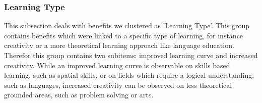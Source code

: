 {%
\subsubsection{Learning Type}
This subsection deals with benefits we clustered as 'Learning Type'. This group contains benefits which were linked to a specific type of learning, for instance creativity or a more theoretical learning approach like language education. \\
Therefor this group contains two subitems: improved learning curve and increased creativity. While an improved learning curve is observable on skills based learning, such as spatial skills, or on fields which require a logical understanding, such as languages, increased creativity can be observed on less theoretical grounded areas, such as problem solving or arts.

}
